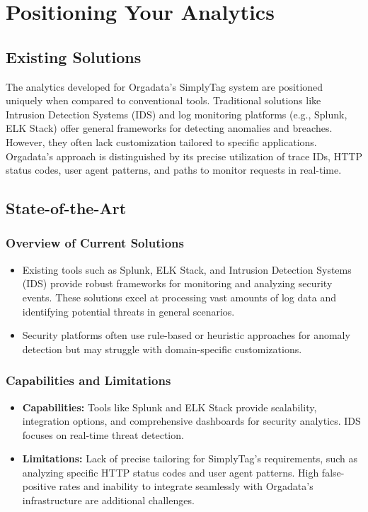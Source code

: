 %
%

\chapter{Positioning Your Analytics}

\section{Existing Solutions}

The analytics developed for Orgadata’s SimplyTag system are positioned uniquely when compared to conventional tools. Traditional solutions like Intrusion Detection Systems (IDS) and log monitoring platforms (e.g., Splunk, ELK Stack) \cite{IEEE:2022} offer general frameworks for detecting anomalies and breaches. However, they often lack customization tailored to specific applications. Orgadata’s approach is distinguished by its precise utilization of trace IDs, HTTP status codes, user agent patterns, and paths to monitor requests in real-time.

\section{State-of-the-Art}

\subsection{Overview of Current Solutions}
\begin{itemize}
	\item Existing tools such as Splunk, ELK Stack, and Intrusion Detection Systems (IDS) \cite{IEEE:2020} provide robust frameworks for monitoring and analyzing security events. These solutions excel at processing vast amounts of log data and identifying potential threats in general scenarios.
	\item Security platforms often use rule-based or heuristic approaches for anomaly detection but may struggle with domain-specific customizations.
\end{itemize}

\subsection{Capabilities and Limitations}
\begin{itemize}
	\item \textbf{Capabilities:} Tools like Splunk and ELK Stack provide scalability, integration options, and comprehensive dashboards for security analytics. IDS focuses on real-time threat detection.
	\item \textbf{Limitations:}  Lack of precise tailoring for SimplyTag’s requirements, such as analyzing specific HTTP status codes and user agent patterns. High false-positive rates and inability to integrate seamlessly with Orgadata’s infrastructure are additional challenges.
\end{itemize}

